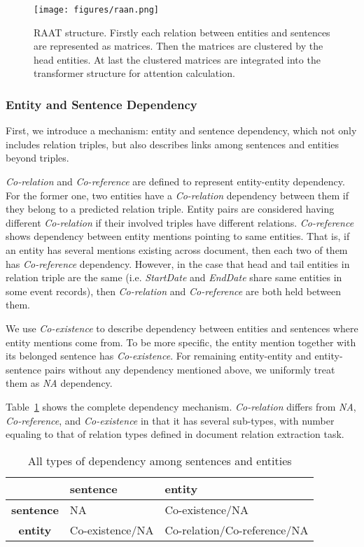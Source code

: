 \documentclass[11pt]{article}
\begin{document}
\begin{figure}
    \centering
    \texttt{[image: figures/raan.png]}
    \caption{RAAT structure. Firstly each relation between entities and sentences are represented as matrices. Then the matrices are clustered by the head entities. At last the clustered matrices are integrated into the transformer structure for attention calculation.}
    \label{fig:raan structure}
\end{figure}

\subsubsection{Entity and Sentence Dependency}

First, we introduce a mechanism: entity and sentence dependency, which not only includes relation triples, but also describes links among sentences and entities beyond triples. 

\textit{Co-relation} and \textit{Co-reference} are defined to represent entity-entity dependency. For the former one, two entities have a \textit{Co-relation} dependency between them if they belong to a predicted relation triple. Entity pairs are considered having different \textit{Co-relation} if their involved triples have different relations. \textit{Co-reference} shows dependency between entity mentions pointing to same entities. That is, if an entity has several mentions existing across document, then each two of them has \textit{Co-reference} dependency. However, in the case that head and tail entities in relation triple are the same (i.e. \textit{StartDate} and \textit{EndDate} share same entities in some event records), then \textit{Co-relation} and \textit{Co-reference} are both held between them.


We use \textit{Co-existence} to describe dependency between entities and sentences where entity mentions come from. To be more specific, the entity mention together with its belonged sentence has \textit{Co-existence}. For remaining entity-entity and entity-sentence pairs without any dependency mentioned above, we uniformly treat them as \textit{NA} dependency. 

Table~\ref{tab:dependency system} shows the complete dependency mechanism. \textit{Co-relation} differs from \textit{NA}, \textit{Co-reference}, and \textit{Co-existence} in that it has several sub-types, with number equaling to that of relation types defined in document relation extraction task.
\begin{table}
    \centering\small
\begin{tabular}{|c|m{7em}|m{7em}|}
    \hline
    & \textbf{sentence} & \textbf{entity} \\
    \hline
    \textbf{sentence} & NA & Co-existence/NA \\
    \hline
    \textbf{entity} & Co-existence/NA & Co-relation/Co-reference/NA \\
    \hline
    \end{tabular}
    \caption{All types of dependency among sentences and entities}
    \label{tab:dependency system}
\end{table}
\end{document}
